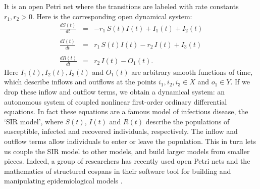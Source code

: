 \documentclass[a4paper,onecolumn, superscriptaddress,10pt, accepted=2022-03-25, issue=SS, volume=VV, shorttitle=papers/compositionality-VV-SS]{compositionalityarticle}
\begin{document}
It is an open Petri net where the transitions are labeled with rate constants $r_1, r_2 > 0$.
Here is the corresponding open dynamical system:
\begin{equation}
\label{eq:openPetrir}
  \begin{array}{ccl} \displaystyle{\frac{dS(t)}{dt}} &=& -r_1 \, S(t)I(t)  + I_1(t) + I_2(t) \\ \\
\displaystyle{\frac{dI(t)}{dt}}  &=& r_1\, S(t)I(t) - r_2 \, I(t) + I_3(t)  \\  \\
\displaystyle{\frac{dR(t)}{dt}}  &=&   r_2 \, I(t)  - O_1(t).
\end{array}
\end{equation}
Here $I_1(t),I_2(t),I_3(t)$ and $O_1(t)$ are arbitrary smooth functions of time, which describe inflows and outflows at the points $i_1,i_2,i_3 \in X$ and $o_1 \in Y$.
If we drop these inflow and outflow terms, we obtain a dynamical system: an autonomous system of coupled nonlinear first-order ordinary differential equations.   In fact these equations are a famous model of infectious disease, the `SIR model', where $S(t)$, $I(t)$ and $R(t)$ describe the populations of susceptible, infected and recovered individuals, respectively.   The inflow and outflow terms allow individuals to enter or leave the population.   This in turn lets us couple the SIR model to other models, and build larger models from smaller pieces.    Indeed, a group of researchers has recently used open Petri nets and the mathematics of structured cospans in their software tool for building and manipulating epidemiological models \cite{AP,BFMLP}.   
\end{document}
